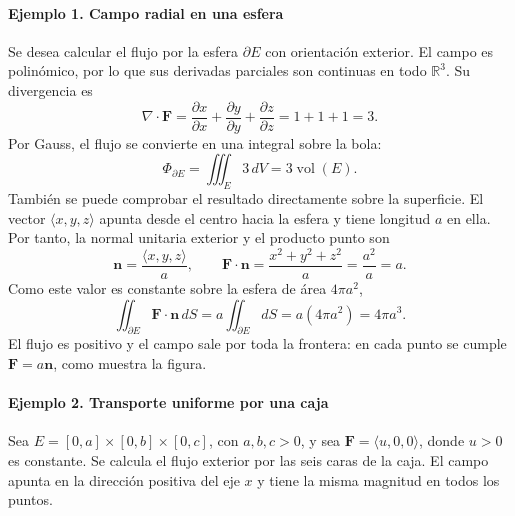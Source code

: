 \paragraph{Ejemplo 1. Campo radial en una esfera}
Se desea calcular el flujo por la esfera $\partial E$ con orientación exterior. El campo es polinómico, por lo que sus derivadas parciales son continuas en todo $\mathbb R^3$. Su divergencia es
\[
\nabla\cdot\mathbf F
=\frac{\partial x}{\partial x}+\frac{\partial y}{\partial y}
+\frac{\partial z}{\partial z}=1+1+1=3.
\]
Por Gauss, el flujo se convierte en una integral sobre la bola:
\[
\Phi_{\partial E}=\iiint_E3\,dV=3\operatorname{vol}(E).
\]
También se puede comprobar el resultado directamente sobre la superficie. El vector $\langle x,y,z\rangle$ apunta desde el centro hacia la esfera y tiene longitud $a$ en ella. Por tanto, la normal unitaria exterior y el producto punto son
\[
\mathbf n=\frac{\langle x,y,z\rangle}{a},
\qquad
\mathbf F\cdot\mathbf n=\frac{x^2+y^2+z^2}{a}
=\frac{a^2}{a}=a.
\]
Como este valor es constante sobre la esfera de área $4\pi a^2$,
\[
\iint_{\partial E}\mathbf F\cdot\mathbf n\,dS
=a\iint_{\partial E}dS=a(4\pi a^2)=4\pi a^3.
\]
El flujo es positivo y el campo sale por toda la frontera: en cada punto se cumple $\mathbf F=a\mathbf n$, como muestra la figura.

\begingroup\shorthandoff{>}
\begin{center}
\end{center}
\endgroup

\paragraph{Ejemplo 2. Transporte uniforme por una caja}
Sea $E=[0,a]\times[0,b]\times[0,c]$, con $a,b,c>0$, y sea $\mathbf F=\langle u,0,0\rangle$, donde $u>0$ es constante. Se calcula el flujo exterior por las seis caras de la caja. El campo apunta en la dirección positiva del eje $x$ y tiene la misma magnitud en todos los puntos.

